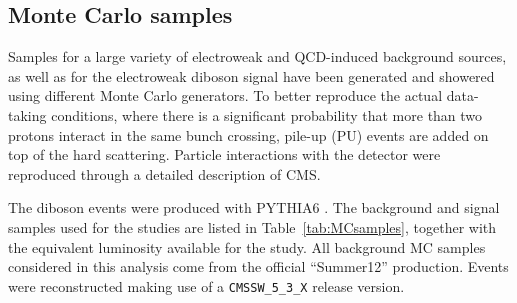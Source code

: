 \subsection{Monte Carlo samples}
Samples for a large variety of electroweak and QCD-induced background sources, 
as well as for the electroweak diboson signal 
have been generated and showered using different Monte Carlo generators.
To better reproduce the actual data-taking conditions, where there is a significant probability
that more than two protons interact in the same bunch crossing, pile-up (PU) events are
added on top of the hard scattering. Particle interactions with the detector were reproduced through
a detailed description of CMS.


The diboson events were produced with PYTHIA6 \cite{pythia}.
The background and signal samples used for the studies are listed in Table~\ref{tab:MCsamples},
together with the equivalent luminosity available for the study.
All background MC samples considered in this analysis come from 
the official ``Summer12'' production. Events were
reconstructed making use of a \texttt{CMSSW\_5\_3\_X} release version. 
